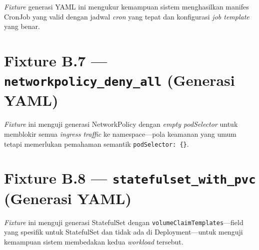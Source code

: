 \textit{Fixture} generasi YAML ini mengukur kemampuan sistem menghasilkan manifes CronJob yang valid dengan jadwal \textit{cron} yang tepat dan konfigurasi \textit{job template} yang benar.



\section{Fixture B.7 — \texttt{networkpolicy\_deny\_all} (Generasi YAML)}

\textit{Fixture} ini menguji generasi NetworkPolicy dengan \textit{empty podSelector} untuk memblokir semua \textit{ingress traffic} ke namespace—pola keamanan yang umum tetapi memerlukan pemahaman semantik \texttt{podSelector: \{\}}.



\section{Fixture B.8 — \texttt{statefulset\_with\_pvc} (Generasi YAML)}

\textit{Fixture} ini menguji generasi StatefulSet dengan \texttt{volumeClaimTemplates}—field yang spesifik untuk StatefulSet dan tidak ada di Deployment—untuk menguji kemampuan sistem membedakan kedua \textit{workload} tersebut.



